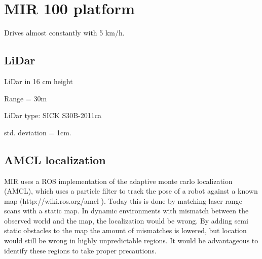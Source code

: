 \section{MIR 100 platform}

Drives almost constantly with 5 km/h.

\subsection{LiDar}
LiDar in 16 cm height

Range = 30m

LiDar type: SICK S30B-2011ca

std. deviation = 1cm.

\subsection{AMCL localization}
MIR uses a ROS implementation of the adaptive monte carlo localization (AMCL), which uses a particle filter to track the pose of a robot against a known map (http://wiki.ros.org/amcl ). Today this is done by matching laser range scans with a static map. In dynamic environments with mismatch between the observed world and the map, the localization would be wrong. By adding semi static obstacles to the map the amount of mismatches is lowered, but location would still be wrong in highly unpredictable regions. It would be advantageous to identify these regions to take proper precautions.




